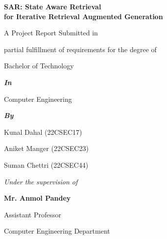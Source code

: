 \documentclass[12pt,a4paper]{report}
\begin{document}

\begin{titlepage}
\thispagestyle{empty}
\begin{center}

\vspace*{0.58in}

{\fontsize{16}{19}\selectfont\bfseries
SAR: State Aware Retrieval\\for Iterative Retrieval Augmented Generation\par}

\vspace{0.18in}

{\fontsize{12}{18}\selectfont
A Project Report Submitted in\par}
\vspace{0.12in}
{\fontsize{12}{18}\selectfont
partial fulfillment of requirements for the degree of\par}
\vspace{0.12in}
{\fontsize{12}{18}\selectfont
Bachelor of Technology\par}
\vspace{0.10in}
{\fontsize{12}{18}\selectfont\bfseries\itshape
In\par}
\vspace{0.08in}
{\fontsize{12}{18}\selectfont
Computer Engineering\par}
\vspace{0.10in}
{\fontsize{12}{18}\selectfont\bfseries\itshape
By\par}
\vspace{0.08in}
{\fontsize{12}{18}\selectfont
Kunal Dahal (22CSEC17)\par
Aniket Manger (22CSEC23)\par
Suman Chettri (22CSEC44)\par}

\vspace{0.10in}

{\fontsize{12}{18}\selectfont\itshape
Under the supervision of\par}
\vspace{0.06in}
{\fontsize{14}{17}\selectfont\bfseries
Mr. Anmol Pandey\par}
\vspace{0.04in}
{\fontsize{12}{18}\selectfont
Assistant Professor\par}
\vspace{0.04in}
{\fontsize{12}{18}\selectfont
Computer Engineering Department\par}
\vspace{0.12in}


\end{center}
\end{titlepage}
\end{document}
